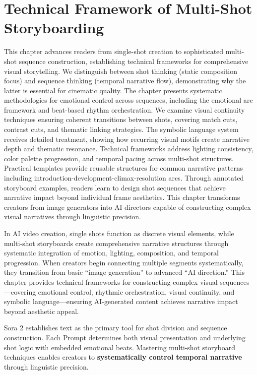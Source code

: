 \chapter{Technical Framework of Multi-Shot Storyboarding}
\label{ch:multi-shot-storyboards}

\begin{chapterabstract}
This chapter advances readers from single-shot creation to sophisticated multi-shot sequence construction, establishing technical frameworks for comprehensive visual storytelling. We distinguish between shot thinking (static composition focus) and sequence thinking (temporal narrative flow), demonstrating why the latter is essential for cinematic quality. The chapter presents systematic methodologies for emotional control across sequences, including the emotional arc framework and beat-based rhythm orchestration. We examine visual continuity techniques ensuring coherent transitions between shots, covering match cuts, contrast cuts, and thematic linking strategies. The symbolic language system receives detailed treatment, showing how recurring visual motifs create narrative depth and thematic resonance. Technical frameworks address lighting consistency, color palette progression, and temporal pacing across multi-shot structures. Practical templates provide reusable structures for common narrative patterns including introduction-development-climax-resolution arcs. Through annotated storyboard examples, readers learn to design shot sequences that achieve narrative impact beyond individual frame aesthetics. This chapter transforms creators from image generators into AI directors capable of constructing complex visual narratives through linguistic precision.
\end{chapterabstract}

In AI video creation, single shots function as discrete visual elements, while multi-shot storyboards create comprehensive narrative structures through systematic integration of emotion, lighting, composition, and temporal progression. When creators begin connecting multiple segments systematically, they transition from basic ``image generation'' to advanced ``AI direction.'' This chapter provides technical frameworks for constructing complex visual sequences—covering emotional control, rhythmic orchestration, visual continuity, and symbolic language—ensuring AI-generated content achieves narrative impact beyond aesthetic appeal.

Sora 2 establishes text as the primary tool for shot division and sequence construction. Each Prompt determines both visual presentation and underlying shot logic with embedded emotional beats. Mastering multi-shot storyboard techniques enables creators to \textbf{systematically control temporal narrative} through linguistic precision.

